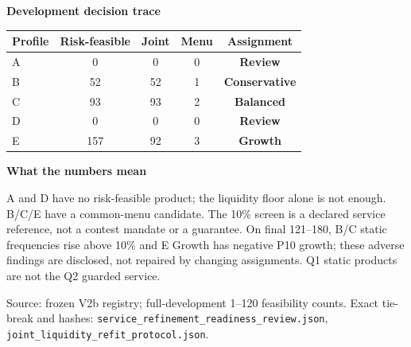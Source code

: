 \documentclass[12pt,a4paper]{article}
\begin{document}
\vspace{2mm}
\begin{minipage}[t]{0.48\textwidth}
{\bfseries Development decision trace\par}
\vspace{1mm}
{\small\setlength{\tabcolsep}{2pt}
\begin{tabular}{@{}lcccc@{}}
\toprule
Profile & Risk-feasible & Joint & Menu & Assignment\\
\midrule
A & 0 & 0 & 0 & \textbf{Review}\\
B & 52 & 52 & 1 & \textbf{Conservative}\\
C & 93 & 93 & 2 & \textbf{Balanced}\\
D & 0 & 0 & 0 & \textbf{Review}\\
E & 157 & 92 & 3 & \textbf{Growth}\\
\bottomrule
\end{tabular}}
\end{minipage}\hfill
\begin{minipage}[t]{0.47\textwidth}
{\bfseries What the numbers mean\par}
\vspace{1mm}
{\small
A and D have no risk-feasible product; the liquidity floor alone is not enough.
B/C/E have a common-menu candidate. The 10\% screen is a declared service
reference, not a contest mandate or a guarantee. On final 121--180, B/C static
frequencies rise above 10\% and E Growth has negative P10 growth; these adverse
findings are disclosed, not repaired by changing assignments. Q1 static products
are not the Q2 guarded service.\par}
\end{minipage}

\vfill
{\footnotesize\raggedright\color{black!65}Source: frozen V2b registry; full-development 1--120 feasibility counts. Exact tie-break and hashes: \texttt{service\_refinement\_readiness\_review.json}, \texttt{joint\_liquidity\_refit\_protocol.json}.\par}
\end{document}

